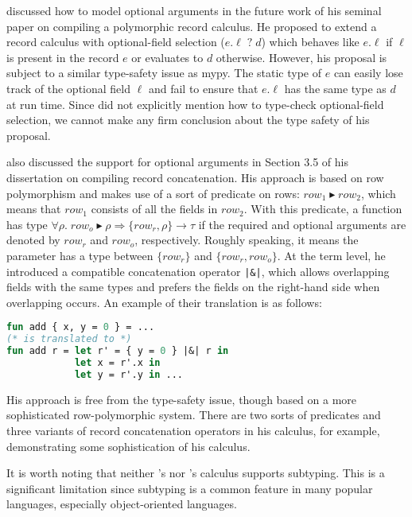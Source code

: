 \citet{ohori1995polymorphic} discussed how to model optional arguments in the
future work of his seminal paper on compiling a polymorphic record calculus. He
proposed to extend a record calculus with optional-field selection
($e.\ell\;?\;d$) which behaves like $e.\ell$ if $\ell$ is present in the record
$e$ or evaluates to $d$ otherwise. However, his proposal is subject to a similar
type-safety issue as mypy. The static type of $e$ can easily lose track of the
optional field $\ell$ and fail to ensure that $e.\ell$ has the same type as $d$
at run time. Since \citeauthor{ohori1995polymorphic} did not explicitly mention
how to type-check optional-field selection, we cannot make any firm conclusion
about the type safety of his proposal.

\citet{osinski2006polymorphic} also discussed the support for optional arguments
in Section 3.5 of his dissertation on compiling record concatenation. His
approach is based on row polymorphism and makes use of a sort of predicate on
rows: $\mathit{row}_1\blacktriangleright\mathit{row}_2$, which means that
$\mathit{row}_1$ consists of all the fields in $\mathit{row}_2$. With this
predicate, a function has type
$\forall\rho.\;\mathit{row}_o\blacktriangleright\rho\Rightarrow\{\mathit{row}_r,\rho\}\to\tau$
if the required and optional arguments are denoted by $\mathit{row}_r$ and
$\mathit{row}_o$, respectively. Roughly speaking, it means the parameter has a
type between $\{\mathit{row}_r\}$ and $\{\mathit{row}_r,\mathit{row}_o\}$. At
the term level, he introduced a compatible concatenation operator
\lstinline{|&|}, which allows overlapping fields with the same types and prefers
the fields on the right-hand side when overlapping occurs. An example of their
translation is as follows:
\begin{lstlisting}[language=Caml]
fun add { x, y = 0 } = ...
(* is translated to *)
fun add r = let r' = { y = 0 } |&| r in
            let x = r'.x in
            let y = r'.y in ...
\end{lstlisting}
His approach is free from the type-safety issue, though based on a more
sophisticated row-polymorphic system. There are two sorts of predicates and
three variants of record concatenation operators in his calculus, for example,
demonstrating some sophistication of his calculus.

It is worth noting that neither \citeauthor{ohori1995polymorphic}'s nor
\citeauthor{osinski2006polymorphic}'s calculus supports subtyping. This is a
significant limitation since subtyping is a common feature in many popular
languages, especially object-oriented languages.
